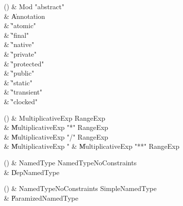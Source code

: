 \begin{bbgrammarappendix}

() & Mod \label{prod:Mod}  \: \xcd"abstract"  \\

 &    \| Annotation \\
 &    \| \xcd"atomic" \\
 &    \| \xcd"final" \\
 &    \| \xcd"native" \\
 &    \| \xcd"private" \\
 &    \| \xcd"protected" \\
 &    \| \xcd"public" \\
 &    \| \xcd"static" \\
 &    \| \xcd"transient" \\
 &    \| \xcd"clocked" \\

\end{bbgrammarappendix}

\begin{bbgrammarappendix}

() & MultiplicativeExp \label{prod:MultiplicativeExp}  \: RangeExp  \\

 &    \| MultiplicativeExp \xcd"*" RangeExp \\
 &    \| MultiplicativeExp \xcd"/" RangeExp \\
 &    \| MultiplicativeExp \xcd"%
 &    \| MultiplicativeExp \xcd"**" RangeExp \\

\end{bbgrammarappendix}

\begin{bbgrammarappendix}

() & NamedType \label{prod:NamedType}  \: NamedTypeNoConstraints  \\

 &    \| DepNamedType \\

\end{bbgrammarappendix}

\begin{bbgrammarappendix}

() & NamedTypeNoConstraints \label{prod:NamedTypeNoConstraints}  \: SimpleNamedType  \\

 &    \| ParamizedNamedType \\

\end{bbgrammarappendix}

